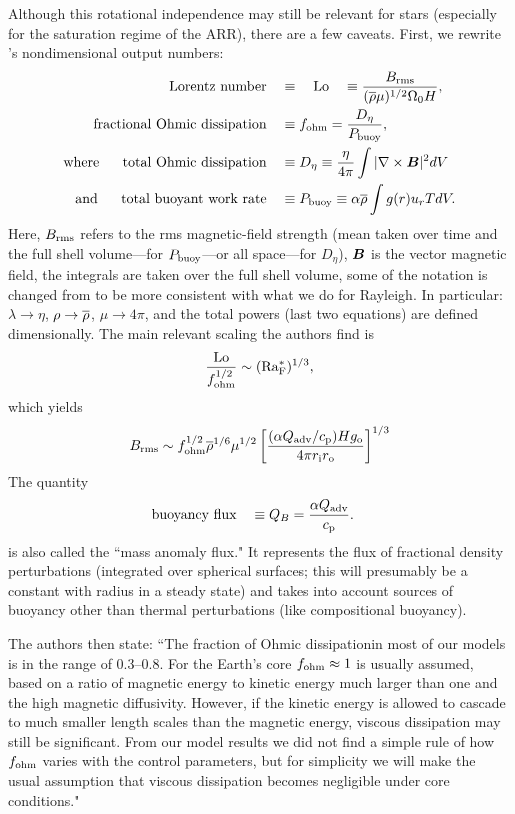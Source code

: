 \documentclass[12pt]{article} %
\begin{document}
 Although this rotational independence may still be relevant for stars (especially for the saturation regime of the ARR), there are a few caveats. First, we rewrite \citet{Christensen2006}'s nondimensional output numbers:
\begin{align}
	\text{Lorentz number} \quad & \equiv \quad {\rm{Lo}} \quad \equiv \frac{B_{\rm{rms}}}{(\overline{\rho}\mu)^{1/2}\Omega_0H},\\
		\text{fractional Ohmic dissipation} \quad & \equiv f_{\rm{ohm}} = \frac{D_\eta}{P_{\rm{buoy}}},\\
		\text{where}\ \ \ \ \  \text{total Ohmic dissipation} \quad & \equiv D_\eta  \equiv \frac{\eta}{4\pi}\int|\nabla\times\bm{B}|^2dV\\
		\text{and}\ \ \ \ \   \text{total buoyant work rate} \quad & \equiv P_{\rm{buoy}}  \equiv \alpha \overline{\rho} \int g(r)u_rTdV.
\end{align}
Here, $B_{\rm{rms}}$ refers to the rms magnetic-field strength (mean taken over time and the full shell volume---for $P_{\rm{buoy}}$---or all space---for $D_\eta$), $\bm{B}$ is the vector magnetic field, the integrals are taken over the full shell volume, some of the notation is changed from \citet{Christensen2006} to be more consistent with what we do for Rayleigh. In particular: $\lambda\rightarrow\eta$, $\rho\rightarrow\overline{\rho}$, $\mu\rightarrow4\pi$, and the total powers (last two equations) are defined dimensionally. The main relevant scaling the authors find is
\begin{align}
	\frac{\rm{Lo}}{f_{\rm{ohm}}^{1/2}}\sim ({\rm{Ra^*_F}})^{1/3},
\end{align}
which yields
\begin{align}\label{eq:fieldstrength}
	B_{\rm{rms}}\sim f_{\rm{ohm}}^{1/2}\overline{\rho}^{1/6}\mu^{1/2}\left[\frac{(\alpha Q_{\rm{adv}}/c_{\rm{p}})Hg_{\rm{o}}}{4\pi r_{\rm{i}}r_{\rm{o}}}\right]^{1/3}
\end{align}
The quantity
\begin{align}
	 \text{buoyancy flux} \quad & \equiv Q_B = \frac{\alpha Q_{\rm{adv}}}{c_{\rm{p}}}.
\end{align}
is also called the ``mass anomaly flux." It represents the flux of fractional density perturbations (integrated over spherical surfaces; this will presumably be a constant with radius in a steady state) and takes into account sources of buoyancy other than thermal perturbations (like compositional buoyancy).

The authors then state: ``The fraction of Ohmic dissipationin most of our models is in the range of 0.3–0.8. For the Earth's core $f_{\rm{ohm}}\approx1$ is usually assumed, based on a ratio of magnetic energy to kinetic energy much larger than one and the high magnetic diffusivity. However, if the kinetic energy is allowed to cascade to much smaller length scales than the magnetic energy, viscous dissipation may still be significant. From our model results we did not find a simple rule of how $f_{\rm{ohm}}$ varies with the control parameters, but for simplicity we will make the usual assumption that viscous dissipation becomes negligible under core conditions." 
\end{document}
